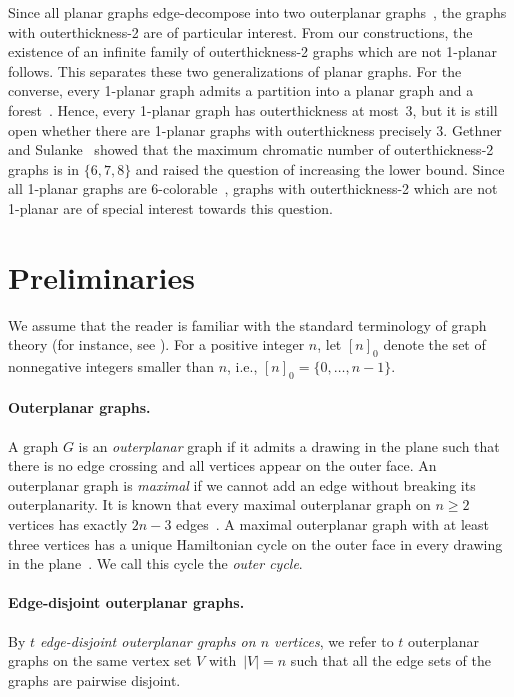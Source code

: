 \documentclass[unicode,runningheads,envcountsame,a4paper,dvipsnames,12pt]{llncs}
\begin{document}
	Since all planar graphs edge-decompose into two outerplanar graphs~\cite{DBLP:conf/stoc/Goncalves05}, the graphs with outerthickness-2 are of particular interest. From our constructions, the existence of an infinite family of outerthickness-2 graphs which are not 1-planar follows. This separates these two generalizations of planar graphs. For the converse, every 1-planar graph admits a partition into a planar graph and a forest~\cite{DBLP:journals/dam/Ackerman14}. Hence, every 1-planar graph has outerthickness at most~3, but it is still open whether there are 1-planar graphs with outerthickness precisely 3. 
	Gethner and Sulanke~\cite{DBLP:journals/gc/GethnerS09} showed that the maximum chromatic number of outerthickness-2 graphs is in \(\{6,7,8\}\) and raised the question of increasing the lower bound. Since all 1-planar graphs are 6-colorable~\cite{borodin1984solution}, graphs with outerthickness-2 which are not 1-planar are of special interest towards this question.
	
	\section{Preliminaries}
	
	We assume that the reader is familiar with the standard terminology of graph theory (for instance, see \cite{Diestel2025}).
	For a positive integer \(n\), let \([n]_0\) denote the set of nonnegative integers smaller than \(n\), i.e., \([n]_0 = \{0,\dots, n-1\}\).
	
	\paragraph{Outerplanar graphs.}
	
	A graph $G$ is an \emph{outerplanar} graph if it admits a drawing in the plane such that there is no edge crossing and all vertices appear on the outer face.
	An outerplanar graph is \emph{maximal} if we cannot add an edge without breaking its outerplanarity.
	It is known that every maximal outerplanar graph on $n \geq 2$ vertices has exactly $2n-3$ edges~\cite[Corollary~11.9(a)]{Harary1969book}.
	A maximal outerplanar graph with at least three vertices has a unique Hamiltonian cycle on the outer face in every drawing in the plane~\cite{SYSLO197947}. We call this cycle the \emph{outer cycle}.
	
	\paragraph{Edge-disjoint outerplanar graphs.} 
	By \emph{\(t\) edge-disjoint outerplanar graphs on \(n\) vertices}, we refer to \(t\) outerplanar graphs on the same vertex set \(V\) with~\(|V|=n\) such that all the edge sets of the graphs are pairwise disjoint.
	
\end{document}

